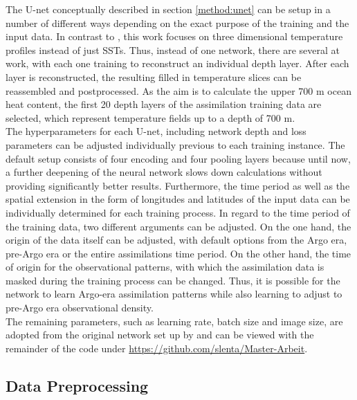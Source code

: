 \documentclass[Masterarbeit.tex]{subfile}
\begin{document}
	The U-net conceptually described in section \ref{method:unet} can be setup in a number of different ways depending on the exact purpose of the training and the input data. In contrast to \cite{kadow_artificial_2020}, this work focuses on three dimensional temperature profiles instead of just SSTs. Thus, instead of one network, there are several at work, with each one training to reconstruct an individual depth layer. After each layer is reconstructed, the resulting filled in temperature slices can be reassembled and postprocessed. As the aim is to calculate the upper 700 m ocean heat content, the first 20 depth layers of the assimilation training data are selected, which represent temperature fields up to a depth of 700 m. \\
	The hyperparameters for each U-net, including network depth and loss parameters can be adjusted individually previous to each training instance. The default setup consists of four encoding and four pooling layers because until now, a further deepening of the neural network slows down calculations without providing significantly better results. Furthermore, the time period as well as the spatial extension in the form of longitudes and latitudes of the input data can be individually determined for each training process. In regard to the time period of the training data, two different arguments can be adjusted. On the one hand, the origin of the data itself can be adjusted, with default options from the Argo era, pre-Argo era or the entire assimilations time period. On the other hand, the time of origin for the observational patterns, with which the assimilation data is masked during the training process can be changed. Thus, it is possible for the network to learn Argo-era assimilation patterns while also learning to adjust to pre-Argo era observational density. \\
	The remaining parameters, such as learning rate, batch size and image size, are adopted from the original network set up by \cite{kadow_artificial_2020} and can be viewed with the remainder of the code under \url{https://github.com/slenta/Master-Arbeit}.
	
	\subsection{Data Preprocessing}
	
\end{document}
